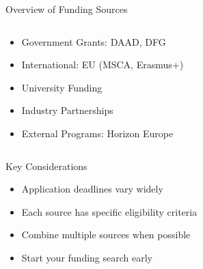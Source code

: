 \documentclass[10pt]{beamer}
\begin{document}
\begin{frame}[fragile]{Overview of Funding Sources}
\begin{columns}[T]
    \begin{column}{0.6\textwidth}
        \begin{itemize}
            \item Government Grants: DAAD, DFG
            \item International: EU (MSCA, Erasmus+)
            \item University Funding
            \item Industry Partnerships
            \item External Programs: Horizon Europe
        \end{itemize}
    \end{column}
    \begin{column}{\textwidth}
    \end{column}
\end{columns}

\vspace{0.5cm}
\alert{Key Considerations}
\begin{itemize}
    \item Application deadlines vary widely
    \item Each source has specific eligibility criteria
    \item Combine multiple sources when possible
    \item Start your funding search early
\end{itemize}
\end{frame}
\end{document}
